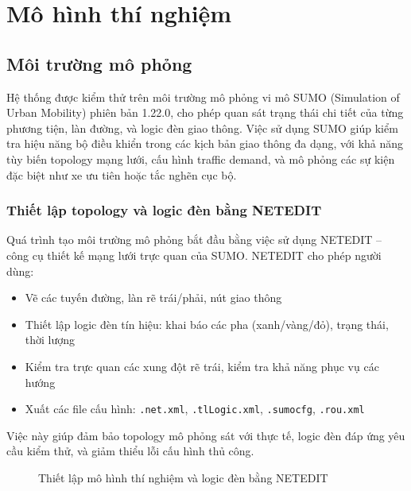\chapter{Mô hình thí nghiệm}

\section{Môi trường mô phỏng}

Hệ thống được kiểm thử trên môi trường mô phỏng vi mô SUMO (Simulation of Urban Mobility) phiên bản 1.22.0, cho phép quan sát trạng thái chi tiết của từng phương tiện, làn đường, và logic đèn giao thông. Việc sử dụng SUMO giúp kiểm tra hiệu năng bộ điều khiển trong các kịch bản giao thông đa dạng, với khả năng tùy biến topology mạng lưới, cấu hình traffic demand, và mô phỏng các sự kiện đặc biệt như xe ưu tiên hoặc tắc nghẽn cục bộ.

\subsection{Thiết lập topology và logic đèn bằng NETEDIT}

Quá trình tạo môi trường mô phỏng bắt đầu bằng việc sử dụng NETEDIT -- công cụ thiết kế mạng lưới trực quan của SUMO. NETEDIT cho phép người dùng:
\begin{itemize}
    \item Vẽ các tuyến đường, làn rẽ trái/phải, nút giao thông
    \item Thiết lập logic đèn tín hiệu: khai báo các pha (xanh/vàng/đỏ), trạng thái, thời lượng
    \item Kiểm tra trực quan các xung đột rẽ trái, kiểm tra khả năng phục vụ các hướng
    \item Xuất các file cấu hình: \texttt{.net.xml}, \texttt{.tlLogic.xml}, \texttt{.sumocfg}, \texttt{.rou.xml}
\end{itemize}
Việc này giúp đảm bảo topology mô phỏng sát với thực tế, logic đèn đáp ứng yêu cầu kiểm thử, và giảm thiểu lỗi cấu hình thủ công.

\begin{figure}[H]
    \centering
    \caption{Thiết lập mô hình thí nghiệm và logic đèn bằng NETEDIT}
    \label{fig:netedit_setup}
\end{figure}

